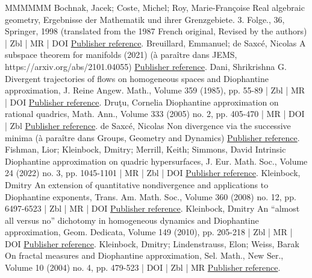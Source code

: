 \begin{thebibliography}{MMMMMM}
 Bochnak, Jacek; Coste, Michel; Roy, Marie-Françoise Real algebraic geometry, Ergebnisse der Mathematik und ihrer Grenzgebiete. 3. Folge., 36, Springer, 1998 (translated from the 1987 French original, Revised by the authors) | Zbl | MR | DOI \href{https://ahl.centre-mersenne.org/item/AHL_2022__5__1009_0/#bcr}{Publisher reference}.
 Breuillard, Emmanuel; de Saxcé, Nicolas A subspace theorem for manifolds (2021) (à paraître dans JEMS, https://arxiv.org/abs/2101.04055) \href{https://ahl.centre-mersenne.org/item/AHL_2022__5__1009_0/#breuillardsaxce}{Publisher reference}.
 Dani, Shrikrishna G. Divergent trajectories of flows on homogeneous spaces and Diophantine approximation, J. Reine Angew. Math., Volume 359 (1985), pp. 55-89 | Zbl | MR | DOI \href{https://ahl.centre-mersenne.org/item/AHL_2022__5__1009_0/#dani_}{Publisher reference}.
 Druţu, Cornelia Diophantine approximation on rational quadrics, Math. Ann., Volume 333 (2005) no. 2, pp. 405-470 | MR | DOI | Zbl \href{https://ahl.centre-mersenne.org/item/AHL_2022__5__1009_0/#drutu}{Publisher reference}.
 de Saxcé, Nicolas Non divergence via the successive minima (à paraître dans Groups, Geometry and Dynamics) \href{https://ahl.centre-mersenne.org/item/AHL_2022__5__1009_0/#saxce_hnnondivergence}{Publisher reference}.
 Fishman, Lior; Kleinbock, Dmitry; Merrill, Keith; Simmons, David Intrinsic Diophantine approximation on quadric hypersurfaces, J. Eur. Math. Soc., Volume 24 (2022) no. 3, pp. 1045-1101 | MR | Zbl | DOI \href{https://ahl.centre-mersenne.org/item/AHL_2022__5__1009_0/#fkms_quadric}{Publisher reference}.
 Kleinbock, Dmitry An extension of quantitative nondivergence and applications to Diophantine exponents, Trans. Am. Math. Soc., Volume 360 (2008) no. 12, pp. 6497-6523 | Zbl | MR | DOI \href{https://ahl.centre-mersenne.org/item/AHL_2022__5__1009_0/#kleinbock_anextension}{Publisher reference}.
 Kleinbock, Dmitry An “almost all versus no” dichotomy in homogeneous dynamics and Diophantine approximation, Geom. Dedicata, Volume 149 (2010), pp. 205-218 | Zbl | MR | DOI \href{https://ahl.centre-mersenne.org/item/AHL_2022__5__1009_0/#kleinbock_dichotomy}{Publisher reference}.
 Kleinbock, Dmitry; Lindenstrauss, Elon; Weiss, Barak On fractal measures and Diophantine approximation, Sel. Math., New Ser., Volume 10 (2004) no. 4, pp. 479-523 | DOI | Zbl | MR \href{https://ahl.centre-mersenne.org/item/AHL_2022__5__1009_0/#klw}{Publisher reference}.

\end{thebibliography}
